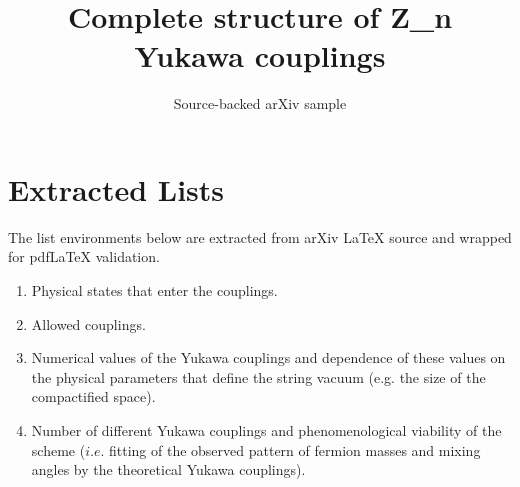 \documentclass[11pt]{article}
\title{Complete structure of Z\_n Yukawa couplings}
\author{Source-backed arXiv sample}
\date{}
\begin{document}
\maketitle
\section{Extracted Lists}

The list environments below are extracted from arXiv LaTeX source and wrapped for pdfLaTeX validation.

\begin{enumerate}
\item[i)] Physical states that enter the couplings.
\item[ii)] Allowed couplings.
\item[iii)] Numerical values of the Yukawa couplings and dependence of these
 values on the
physical parameters  that define the string vacuum (e.g. the size of the
 compactified space).
\item[iv)] Number of different Yukawa couplings and phenomenological viability
 of the scheme
($i.e.$ fitting of the observed pattern of fermion masses and mixing angles by
the theoretical Yukawa couplings).
\end{enumerate}
\end{document}
